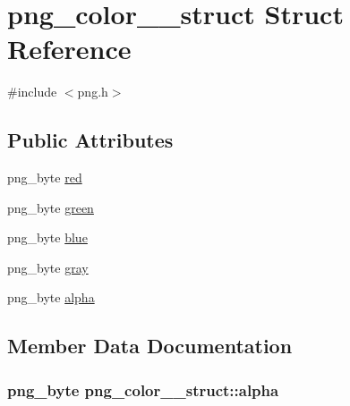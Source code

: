 \hypertarget{structpng__color__8__struct}{}\section{png\+\_\+color\+\_\+\_\+struct Struct Reference}
\label{structpng__color__8__struct}


{\ttfamily \#include $<$png.\+h$>$}

\subsection*{Public Attributes}
\begin{DoxyCompactItemize}
\item 
png\+\_\+byte \hyperlink{structpng__color__8__struct_a5cd91bb4b3429256b84e6f28c72778b8}{red}
\item 
png\+\_\+byte \hyperlink{structpng__color__8__struct_a40d053224177df35c037525b39563b05}{green}
\item 
png\+\_\+byte \hyperlink{structpng__color__8__struct_a58225d3b6426185d5a40d3c9935db96a}{blue}
\item 
png\+\_\+byte \hyperlink{structpng__color__8__struct_a574edc173d956cca144927262e88653e}{gray}
\item 
png\+\_\+byte \hyperlink{structpng__color__8__struct_af1c7203aefe12bd35dc9a4cdd58e7a4b}{alpha}
\end{DoxyCompactItemize}


\subsection{Member Data Documentation}
\hypertarget{structpng__color__8__struct_af1c7203aefe12bd35dc9a4cdd58e7a4b}{}
\subsubsection[{alpha}]{\setlength{\rightskip}{0pt plus 5cm}png\+\_\+byte png\+\_\+color\+\_\+\_\+struct\+::alpha}\label{structpng__color__8__struct_af1c7203aefe12bd35dc9a4cdd58e7a4b}
\hypertarget{structpng__color__8__struct_a58225d3b6426185d5a40d3c9935db96a}{}
